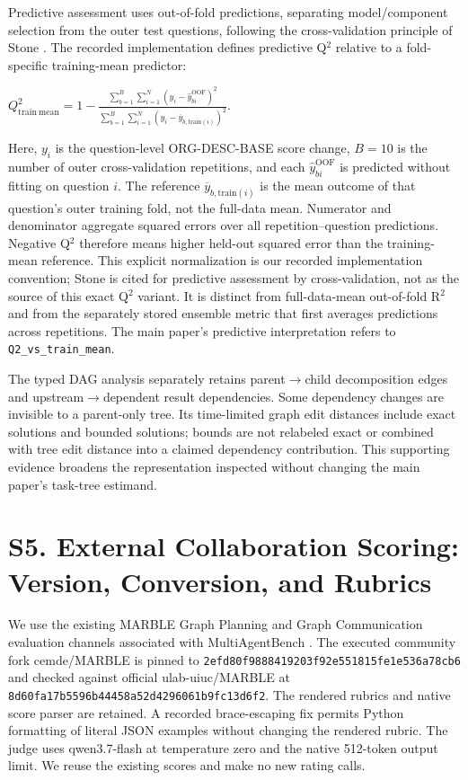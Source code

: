 \documentclass[10pt,letterpaper,twocolumn]{article}
\begin{document}
Predictive assessment uses out-of-fold predictions, separating model/component selection from the outer test questions, following the cross-validation principle of Stone \cite{stone}. The recorded implementation defines predictive Q$^2$ relative to a fold-specific training-mean predictor:


$Q^2_{\mathrm{train\ mean}} = 1 - \frac{\sum_{b=1}^{B}\sum_{i=1}^{N}(y_i-\widehat{y}_{bi}^{\mathrm{OOF}})^2}{\sum_{b=1}^{B}\sum_{i=1}^{N}(y_i-\overline{y}_{b,\mathrm{train}(i)})^2}$.


Here, $y_i$ is the question-level ORG-DESC-BASE score change, $B=10$ is the number of outer cross-validation repetitions, and each $\widehat{y}_{bi}^{\mathrm{OOF}}$ is predicted without fitting on question $i$. The reference $\overline{y}_{b,\mathrm{train}(i)}$ is the mean outcome of that question's outer training fold, not the full-data mean. Numerator and denominator aggregate squared errors over all repetition--question predictions. Negative Q$^2$ therefore means higher held-out squared error than the training-mean reference. This explicit normalization is our recorded implementation convention; Stone is cited for predictive assessment by cross-validation, not as the source of this exact Q$^2$ variant. It is distinct from full-data-mean out-of-fold R$^2$ and from the separately stored ensemble metric that first averages predictions across repetitions. The main paper's predictive interpretation refers to \nolinkurl{Q2_vs_train_mean}.


The typed DAG analysis separately retains parent$\rightarrow$child decomposition edges and upstream$\rightarrow$dependent result dependencies. Some dependency changes are invisible to a parent-only tree. Its time-limited graph edit distances include exact solutions and bounded solutions; bounds are not relabeled exact or combined with tree edit distance into a claimed dependency contribution. This supporting evidence broadens the representation inspected without changing the main paper's task-tree estimand.


\section*{S5. External Collaboration Scoring: Version, Conversion, and Rubrics}

We use the existing MARBLE Graph Planning and Graph Communication evaluation channels associated with MultiAgentBench \cite{mab}. The executed community fork cemde/MARBLE is pinned to \nolinkurl{2efd80f9888419203f92e551815fe1e536a78cb6} and checked against official ulab-uiuc/MARBLE at \nolinkurl{8d60fa17b5596b44458a52d4296061b9fc13d6f2}. The rendered rubrics and native score parser are retained. A recorded brace-escaping fix permits Python formatting of literal JSON examples without changing the rendered rubric. The judge uses qwen3.7-flash at temperature zero and the native 512-token output limit. We reuse the existing scores and make no new rating calls.
\end{document}
